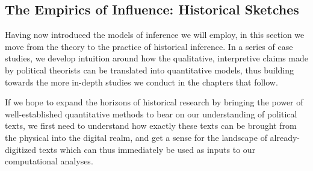 \documentclass[11pt]{article}
\begin{document}


\subsection{The Empirics of Influence: Historical Sketches}\label{sec:empirics-of-influence}

Having now introduced the models of inference we will employ, in this section we move from the theory to the practice of historical inference. In a series of case studies, we develop intuition around how the qualitative, interpretive claims made by political theorists can be translated into quantitative models, thus building towards the more in-depth studies we conduct in the chapters that follow.



If we hope to expand the horizons of historical research by bringing the power of well-established quantitative methods to bear on our understanding of political texts, we first need to understand how exactly these texts can be brought from the physical into the digital realm, and get a sense for the landscape of already-digitized texts which can thus immediately be used as inputs to our computational analyses.
\end{document}
